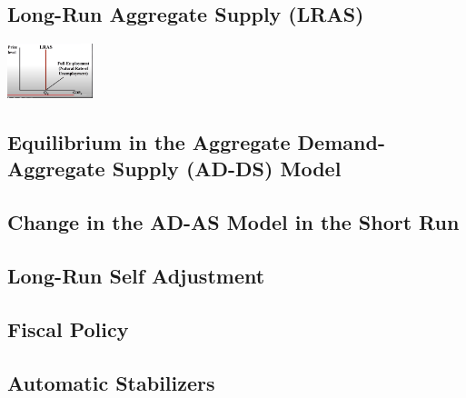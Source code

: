 \documentclass[8pt]{beamer}
\begin{document}
  \begin{frame}
	\section{Long-Run Aggregate Supply (LRAS)}
	\includegraphics[width=2.5cm]{2021-10-12-12-18-10.png}
  \end{frame}
  \begin{frame}
	\section{Equilibrium in the Aggregate Demand-Aggregate Supply (AD-DS) Model}
  \end{frame}
  \begin{frame}
	\section{Change in the AD-AS Model in the Short Run}
  \end{frame}
  \begin{frame}
	\section{Long-Run Self Adjustment}
  \end{frame}
  \begin{frame}
	\section{Fiscal Policy}
  \end{frame}
  \begin{frame}
	\section{Automatic Stabilizers}
  \end{frame}
\end{document}
